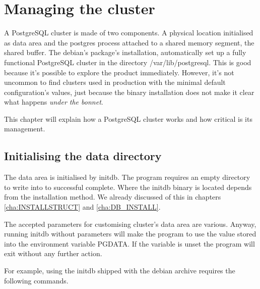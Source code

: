 \chapter{Managing the cluster}

\label{cha:MANAGING}

A PostgreSQL cluster is made of two components. A physical location initialised
as data area and the postgres process attached to a shared memory segment, the
shared buffer. The debian's package's installation, automatically set up a
fully functional PostgreSQL cluster in the directory /var/lib/postgresql. This
is good because it's possible to explore the product immediately. However, it's
not uncommon to find clusters used in production with the minimal default
configuration's values, just because the binary installation does not make it
clear what happens \textit{under the bonnet}.

This chapter will explain how a PostgreSQL cluster works and how critical is
its management.

\section{Initialising the data directory}

\label{sec:INITPGDATA}

The data area is initialised by initdb. The program requires an
empty directory to write into to successful complete. Where the initdb binary
is located depends from the installation method. We already discussed of this
in chapters \ref{cha:INSTALLSTRUCT} and \ref{cha:DB_INSTALL}.

The accepted parameters for customising cluster's data area are various.
Anyway, running initdb without parameters will make the program to use the
value stored into the environment variable PGDATA. If the variable is unset the
program will exit without any further action.\newline

For example, using the initdb shipped with the debian archive requires the
following commands.

